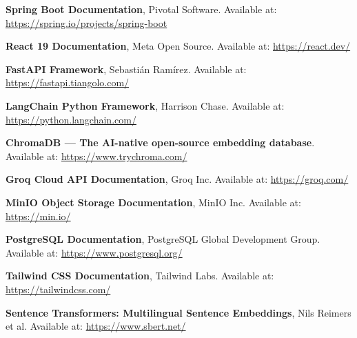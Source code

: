 \documentclass[12pt,a4paper]{report}
\begin{document}
\begin{enumerate}[label={[\arabic*]}, itemsep=8pt]
    \item \textbf{Spring Boot Documentation}, Pivotal Software. Available at: \url{https://spring.io/projects/spring-boot}
    \item \textbf{React 19 Documentation}, Meta Open Source. Available at: \url{https://react.dev/}
    \item \textbf{FastAPI Framework}, Sebastián Ramírez. Available at: \url{https://fastapi.tiangolo.com/}
    \item \textbf{LangChain Python Framework}, Harrison Chase. Available at: \url{https://python.langchain.com/}
    \item \textbf{ChromaDB — The AI-native open-source embedding database}. Available at: \url{https://www.trychroma.com/}
    \item \textbf{Groq Cloud API Documentation}, Groq Inc. Available at: \url{https://groq.com/}
    \item \textbf{MinIO Object Storage Documentation}, MinIO Inc. Available at: \url{https://min.io/}
    \item \textbf{PostgreSQL Documentation}, PostgreSQL Global Development Group. Available at: \url{https://www.postgresql.org/}
    \item \textbf{Tailwind CSS Documentation}, Tailwind Labs. Available at: \url{https://tailwindcss.com/}
    \item \textbf{Sentence Transformers: Multilingual Sentence Embeddings}, Nils Reimers et al. Available at: \url{https://www.sbert.net/}
\end{enumerate}
\end{document}
